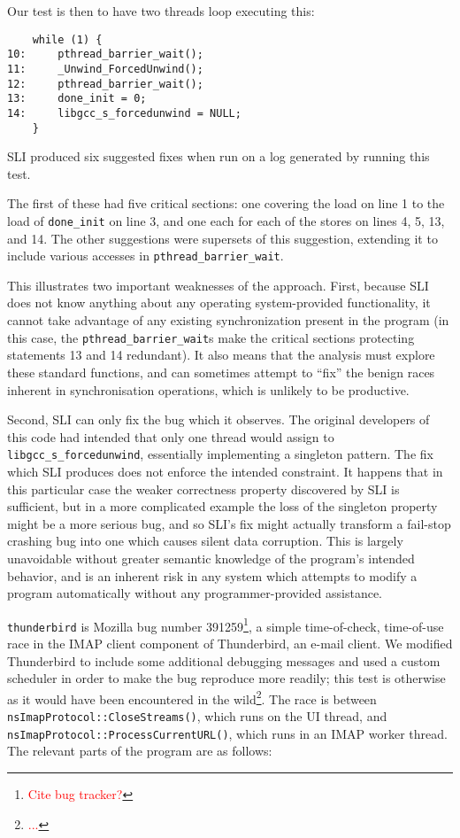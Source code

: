 \documentclass[10pt,twocolumn,preprint,natbib,authoryear]{sigplanconf}
\newcommand{\editorial}[1]{\textcolor{red}{\footnote{\textcolor{red}{#1}}}}
\begin{document}
Our test is then to have two threads loop executing this:

\begin{verbatim}
    while (1) {
10:     pthread_barrier_wait();
11:     _Unwind_ForcedUnwind();
12:     pthread_barrier_wait();
13:     done_init = 0;
14:     libgcc_s_forcedunwind = NULL;
    }
\end{verbatim}

SLI produced six suggested fixes when run on a log generated by
running this test.

The first of these had five critical sections: one covering the load
on line 1 to the load of \verb|done_init| on line 3, and one each for
each of the stores on lines 4, 5, 13, and 14.  The other suggestions
were supersets of this suggestion, extending it to include various
accesses in \verb|pthread_barrier_wait|.

This illustrates two important weaknesses of the approach.  First,
because SLI does not know anything about any operating system-provided
functionality, it cannot take advantage of any existing
synchronization present in the program (in this case, the
\verb|pthread_barrier_wait|s make the critical sections protecting
statements 13 and 14 redundant).  It also means that the analysis must
explore these standard functions, and can sometimes attempt to ``fix''
the benign races inherent in synchronisation operations, which is
unlikely to be productive.

Second, SLI can only fix the bug which it observes.  The original
developers of this code had intended that only one thread would assign
to \verb|libgcc_s_forcedunwind|, essentially implementing a singleton
pattern.  The fix which SLI produces does not enforce the intended
constraint.  It happens that in this particular case the weaker
correctness property discovered by SLI is sufficient, but in a more
complicated example the loss of the singleton property might be a more
serious bug, and so SLI's fix might actually transform a fail-stop
crashing bug into one which causes silent data corruption.  This is
largely unavoidable without greater semantic knowledge of the
program's intended behavior, and is an inherent risk in any system
which attempts to modify a program automatically without any
programmer-provided assistance.

\verb|thunderbird| is Mozilla bug number 391259\editorial{Cite bug
  tracker?}, a simple time-of-check, time-of-use race in the IMAP
client component of Thunderbird, an e-mail client.  We modified
Thunderbird to include some additional debugging messages and used a
custom scheduler in order to make the bug reproduce more readily; this
test is otherwise as it would have been encountered in the
wild\editorial{...}.  The race is between
\verb|nsImapProtocol::CloseStreams()|, which runs on the UI thread,
and \verb|nsImapProtocol::ProcessCurrentURL()|, which runs in an IMAP
worker thread.  The relevant parts of the program are as follows:
\end{document}
